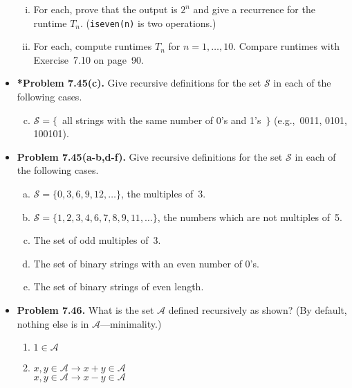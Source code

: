 \documentclass[11pt]{article}
\def\imp{\rightarrow}
\begin{document}
\begin{itemize}
\begin{enumerate}[(i)]
\item For each, prove that the output is $2^n$ and give a recurrence for the runtime $T_n$.
  (\verb+iseven(n)+ is two operations.)
\item For each, compute runtimes $T_n$ for $n=1,\ldots,10$.
  Compare runtimes with Exercise~7.10 on page~90.
\end{enumerate}
\vspace{0.1in}

\item \textbf{*Problem 7.45(c).}
Give recursive definitions for the set $\mathcal{S}$ in each of the following cases.
\begin{enumerate}[(a)]
\setcounter{enumi}{2}
\item $\mathcal{S}=\{$\ all strings with the same number of 0's and 1's\ $\}$
  (e.g.,~0011, 0101, 100101).
\end{enumerate}

\vspace{0.1in}

\item \textbf{Problem 7.45(a-b,d-f).}
Give recursive definitions for the set $\mathcal{S}$ in each of the following cases.
\begin{enumerate}[(a)]
\item $\mathcal{S}=\{0,3,6,9,12,\dots\}$, the multiples of~3.
\item $\mathcal{S}=\{1,2,3,4,6,7,8,9,11,\dots\}$, the numbers which are not multiples of~5.
\setcounter{enumi}{3}
\item The set of odd multiples of~3.
\item The set of binary strings with an even number of 0's.
\item The set of binary strings of even length.
\end{enumerate}

\vspace{0.1in}

\item \textbf{Problem 7.46.}
What is the set $\mathcal{A}$ defined recursively as shown?
(By default, nothing else is in $\mathcal{A}$---minimality.)
\begin{enumerate}[(1)]
\item $1\in\mathcal{A}$
\item $x,y\in\mathcal{A}\imp x+y\in\mathcal{A}$ \\
  $x,y\in\mathcal{A}\imp x-y\in\mathcal{A}$
\end{enumerate}


\end{itemize}
\end{document}
